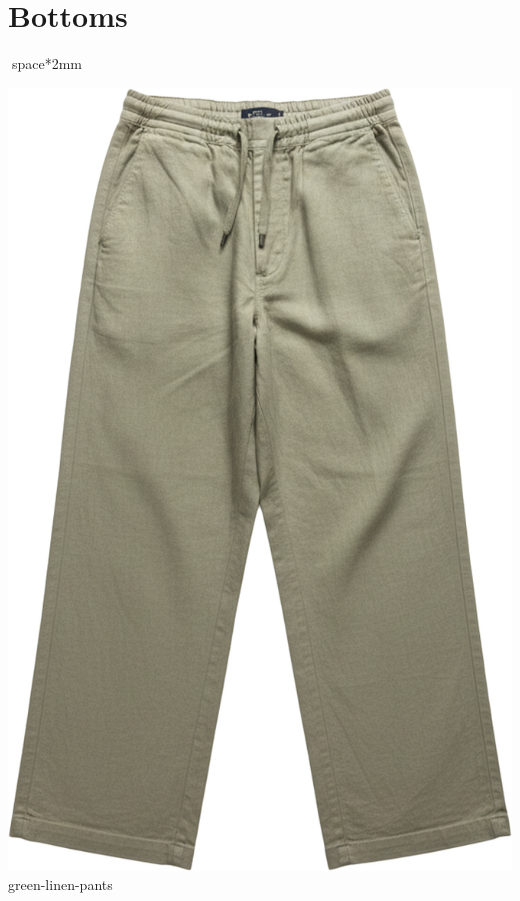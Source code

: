 \documentclass[10pt]{article}
\begin{document}
\section*{Bottoms}space*{2mm}
\begin{minipage}[t]{0.22\textwidth}\centering\vspace{0mm}
\includegraphics[width=\linewidth,keepaspectratio]{assets/pants/green-linen-pants.png}\\
\vspace{0.5mm}\tiny green-linen-pants\end{minipage}
\end{document}
